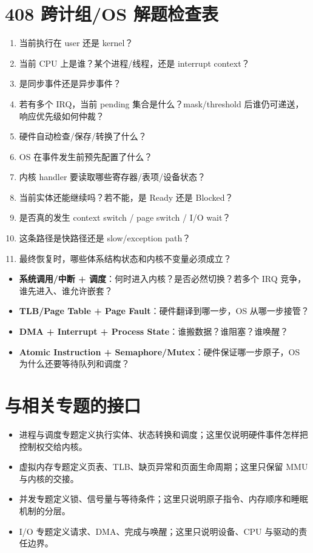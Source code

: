 \documentclass[11pt,a4paper]{ctexart}
\newcommand{\kw}[1]{\textbf{#1}}
\begin{document}
\section{408 跨计组/OS 解题检查表}

\begin{method}[软硬件分工十一问]
\begin{enumerate}
  \item 当前执行在 user 还是 kernel？
  \item 当前 CPU 上是谁？某个进程/线程，还是 interrupt context？
  \item 是同步事件还是异步事件？
  \item 若有多个 IRQ，当前 pending 集合是什么？mask/threshold 后谁仍可递送，响应优先级如何仲裁？
  \item 硬件自动检查/保存/转换了什么？
  \item OS 在事件发生前预先配置了什么？
  \item 内核 handler 要读取哪些寄存器/表项/设备状态？
  \item 当前实体还能继续吗？若不能，是 Ready 还是 Blocked？
  \item 是否真的发生 context switch / page switch / I/O wait？
  \item 这条路径是快路径还是 slow/exception path？
  \item 最终恢复时，哪些体系结构状态和内核不变量必须成立？
\end{enumerate}
\end{method}

\begin{exam}[四类最常见综合题]
\begin{itemize}
  \item \kw{系统调用/中断 + 调度}：何时进入内核？是否必然切换？若多个 IRQ 竞争，谁先进入、谁允许嵌套？
  \item \kw{TLB/Page Table + Page Fault}：硬件翻译到哪一步，OS 从哪一步接管？
  \item \kw{DMA + Interrupt + Process State}：谁搬数据？谁阻塞？谁唤醒？
  \item \kw{Atomic Instruction + Semaphore/Mutex}：硬件保证哪一步原子，OS 为什么还要等待队列和调度？
\end{itemize}
\end{exam}

\section{与相关专题的接口}
\begin{bridge}[责任边界]
\begin{itemize}
  \item 进程与调度专题定义执行实体、状态转换和调度；这里仅说明硬件事件怎样把控制权交给内核。
  \item 虚拟内存专题定义页表、TLB、缺页异常和页面生命周期；这里只保留 MMU 与内核的交接。
  \item 并发专题定义锁、信号量与等待条件；这里只说明原子指令、内存顺序和睡眠机制的分层。
  \item I/O 专题定义请求、DMA、完成与唤醒；这里只说明设备、CPU 与驱动的责任边界。
\end{itemize}
\end{bridge}
\end{document}
